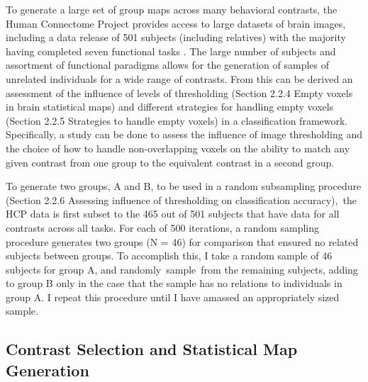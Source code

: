 \documentclass{report}
\begin{document}
To generate a large set of group maps across many behavioral
contrasts, the Human Connectome Project
 \cite{Van_Essen2013-fi,Van_Essen2012-wp} provides access to large datasets of brain images, including a data release of
501 subjects (including relatives) with the majority having completed
seven functional tasks \cite{Van_Essen2013-fi}.
The large number of subjects and assortment of functional paradigms
allows for the generation of samples of unrelated individuals for a wide
range of contrasts. From this can be derived an assessment of the
influence of levels of thresholding (Section 2.2.4 Empty voxels in brain
statistical maps) and different strategies for handling empty voxels
(Section 2.2.5 Strategies to handle empty voxels) in a classification
framework. Specifically, a study can be done to assess the influence of
image thresholding and the choice of how to handle non-overlapping
voxels on the ability to match any given contrast from one group to the
equivalent contrast in a second group.

To generate two groups, A and B, to be used in a random subsampling
procedure (Section 2.2.6 Assessing influence of thresholding on
classification accuracy),~the HCP data is first subset to the 465 out of
501 subjects that have data for all contrasts across all tasks. For each
of 500 iterations, a random sampling procedure generates two groups (N =
46) for comparison that ensured no related subjects between groups. To
accomplish this, I take a random sample of 46 subjects for group A, and
randomly~sample~from the remaining subjects, adding to group B only in
the case that the sample has no relations to individuals in group A. I
repeat this procedure until I have amassed an appropriately sized
sample.

\subsection{Contrast Selection and Statistical Map Generation}
\end{document}
